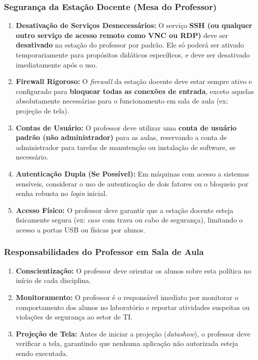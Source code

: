 \documentclass[12pt]{article}
\begin{document}
\subsubsection{Segurança da Estação Docente (Mesa do Professor)}
\begin{enumerate}
    \item \textbf{Desativação de Serviços Desnecessários:} O serviço \textbf{SSH (ou qualquer outro serviço de acesso remoto como VNC ou RDP)} deve ser \textbf{desativado} na estação do professor por padrão. Ele só poderá ser ativado temporariamente para propósitos didáticos específicos, e deve ser desativado imediatamente após o uso.
    \item \textbf{Firewall Rigoroso:} O \emph{firewall} da estação docente deve estar sempre ativo e configurado para \textbf{bloquear todas as conexões de entrada}, exceto aquelas absolutamente necessárias para o funcionamento em sala de aula (ex: projeção de tela).
    \item \textbf{Contas de Usuário:} O professor deve utilizar uma \textbf{conta de usuário padrão (não administrador)} para as aulas, reservando a conta de administrador para tarefas de manutenção ou instalação de software, se necessário.
    \item \textbf{Autenticação Dupla (Se Possível):} Em máquinas com acesso a sistemas sensíveis, considerar o uso de autenticação de dois fatores ou o bloqueio por senha robusta no \emph{login} inicial.
    \item \textbf{Acesso Físico:} O professor deve garantir que a estação docente esteja fisicamente segura (ex: \emph{case} com trava ou cabo de segurança), limitando o acesso a portas USB ou físicas por alunos.
\end{enumerate}

\subsubsection{Responsabilidades do Professor em Sala de Aula}
\begin{enumerate}
    \item \textbf{Conscientização:} O professor deve orientar os alunos sobre esta política no início de cada disciplina.
    \item \textbf{Monitoramento:} O professor é o responsável imediato por monitorar o comportamento dos alunos no laboratório e reportar atividades suspeitas ou violações de segurança ao setor de TI.
    \item \textbf{Projeção de Tela:} Antes de iniciar a projeção (\emph{datashow}), o professor deve verificar a tela, garantindo que nenhuma aplicação não autorizada esteja sendo executada.
\end{enumerate}
\end{document}
